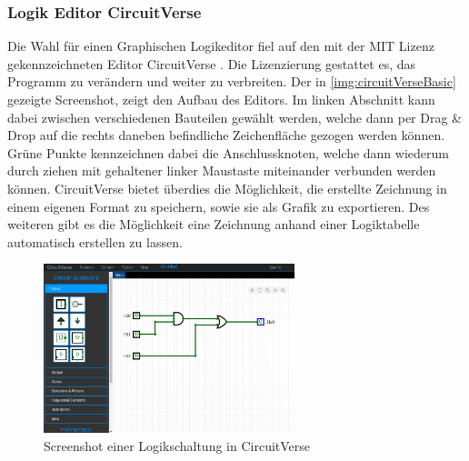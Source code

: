 \subsubsection{Logik Editor CircuitVerse}\label{kap:circuitVerse}
Die Wahl für einen Graphischen Logikeditor fiel auf den mit der MIT Lizenz gekennzeichneten Editor CircuitVerse \cite{URL:CircuitVerse}. Die Lizenzierung gestattet es, das Programm zu verändern und weiter zu verbreiten. Der in \autoref{img:circuitVerseBasic} gezeigte Screenshot, zeigt den Aufbau des Editors. Im linken Abschnitt kann dabei zwischen verschiedenen Bauteilen gewählt werden, welche dann per Drag \& Drop auf die rechts daneben befindliche Zeichenfläche gezogen werden können. Grüne Punkte kennzeichnen dabei die Anschlussknoten, welche dann wiederum durch ziehen mit gehaltener linker Maustaste miteinander verbunden werden können. CircuitVerse bietet überdies die Möglichkeit, die erstellte Zeichnung in einem eigenen Format zu  speichern, sowie sie als Grafik zu exportieren. Des weiteren gibt es die Möglichkeit eine Zeichnung anhand einer Logiktabelle automatisch erstellen zu lassen. 

\begin{figure}[H]
	\begin{center}
		\includegraphics[width=0.65\textwidth ,clip]{./images/circuitverse.jpg}
		\caption{Screenshot einer Logikschaltung in CircuitVerse}
		\label{img:circuitVerseBasic}
	\end{center} 
\end{figure}	

